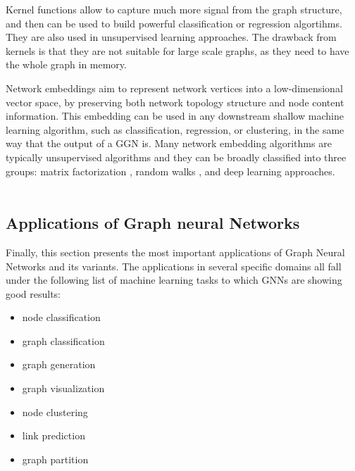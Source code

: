Kernel functions allow to capture much more signal from the graph structure, and then can be used to build powerful classification or regression algortihms. They are also used in unsupervised learning approaches. The drawback from kernels is that they are not suitable for large scale graphs, as they need to have the whole graph in memory.

 
Network embeddings aim to represent network vertices into a low-dimensional vector space, by preserving both network topology structure and node content information. This embedding can be used in any downstream shallow machine learning algorithm, such as classification, regression, or clustering, in the same way that the output of a GGN is. Many network embedding algorithms are typically unsupervised algorithms and they can be broadly classified into three groups: matrix factorization \cite{38}, random walks \cite{40}, and deep learning approaches.\\











\\
\subsection{Applications of Graph neural Networks}


Finally, this section presents the most important applications of Graph Neural Networks and its variants. The applications in several specific domains all fall under the following list of machine learning tasks to which GNNs are showing good results:
\begin{itemize}
	\item node classification
	\item graph classification
	\item graph generation
	\item graph visualization
	\item node clustering
	\item link prediction
	\item graph partition
\end{itemize}


